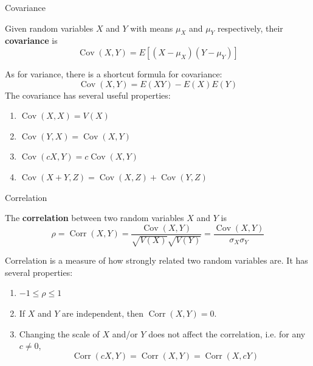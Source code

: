 \documentclass[handout]{beamer}
\renewcommand{\emph}{\textbf}
\DeclareMathOperator{\Cov}{Cov}
\DeclareMathOperator{\Corr}{Corr}
\begin{document}
\begin{frame}{Covariance}
\begin{block}{}
Given random variables $X$ and $Y$ with means $\mu_X$ and $\mu_Y$ respectively, their \emph{covariance} is
$$\Cov(X,Y) = E[(X-\mu_X)(Y-\mu_Y)]$$
\end{block}
\pause As for variance, there is a shortcut formula for covariance:
$$\Cov(X,Y) = E(XY) - E(X)E(Y)$$
\pause The covariance has several useful properties: 
\begin{block}{}
\begin{enumerate}
\item $\Cov(X,X) = V(X)$
\item $\Cov(Y,X) = \Cov(X,Y)$
\item $\Cov(cX,Y) = c\Cov(X,Y)$
\item $\Cov(X+Y,Z) = \Cov(X,Z)+\Cov(Y,Z)$
\end{enumerate}
\end{block}
\end{frame}

\begin{frame}{Correlation}
\begin{block}{}
The \emph{correlation} between two random variables $X$ and $Y$ is 
$$\rho = \Corr(X,Y) = \frac{\Cov(X,Y)}{\sqrt{V(X)}\sqrt{V(Y)}} = \frac{\Cov(X,Y)}{\sigma_X\sigma_Y}$$
\end{block}
Correlation is a measure of how strongly related two random variables are. \pause It has several properties:
\begin{block}{}
\begin{enumerate}
\item $-1 \leq \rho \leq 1$
\item  If $X$ and $Y$ are independent, then $\Corr(X,Y)=0$.
\item Changing the scale of $X$ and/or $Y$ does not affect the correlation, i.e. for any $c\neq 0$,
$$\Corr(cX,Y) = \Corr(X,Y) = \Corr(X,cY)$$
\end{enumerate}
\end{block}
\end{frame}
\end{document}
